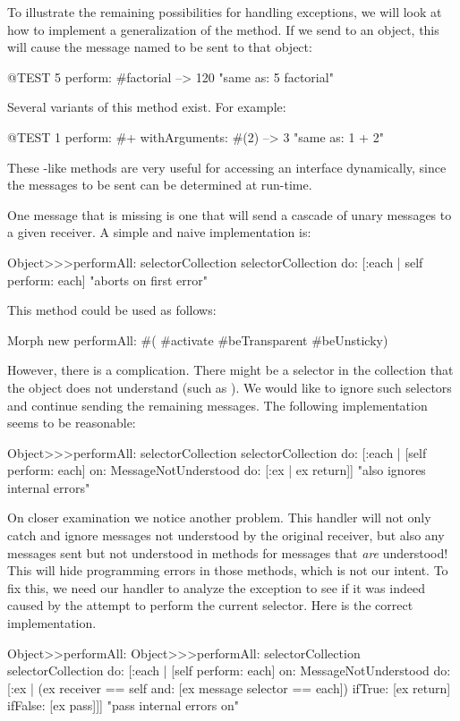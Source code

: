 \documentclass[a4paper,10pt,twoside]{book}
\begin{document}
To illustrate the remaining possibilities for handling exceptions, we will look at how to implement a generalization of the  method.
If we send  to an object, this will cause the message named  to be sent  to that object:
\begin{code}{@TEST}
5 perform: #factorial --> 120    "same as: 5 factorial"
\end{code}

Several variants of this method exist. For example:
\begin{code}{@TEST}
1 perform: #+ withArguments: #(2) --> 3    "same as: 1 + 2"
\end{code}
These -like methods are very useful for accessing an interface dynamically, since the messages to be sent can be determined at run-time.

One message that is missing is one that will send a cascade of unary messages to a given receiver. A simple and naive implementation is:
\begin{code}{}
Object>>>performAll: selectorCollection
	selectorCollection do: [:each | self perform: each]    "aborts on first error"
\end{code}

This method could be used as follows:
\begin{code}{}
Morph new performAll: #( #activate #beTransparent #beUnsticky)
\end{code}

However, there is a complication. There might be a selector in the collection that the object does not understand (such as ). We would like to ignore such selectors and continue sending the remaining messages. The following implementation seems to be reasonable:

\begin{code}{}
Object>>>performAll: selectorCollection 
	selectorCollection do: [:each |
		[self perform: each]
			on: MessageNotUnderstood
			do: [:ex | ex return]]    "also ignores internal errors"
\end{code}

On closer examination we notice another problem. This handler will not only catch and ignore messages not understood by the original receiver, but also any messages sent but not understood in methods for messages that \emph{are} understood! This will hide programming errors in those methods, which is not our intent.
To fix this, we need our handler to analyze the exception to see if it was indeed caused by the attempt to perform the current selector.
Here is the correct implementation.
\begin{method}[objectPerformAll]{Object>>performAll:}
Object>>>performAll: selectorCollection 
	selectorCollection do: [:each | 
		[self perform: each] 
			on: MessageNotUnderstood 
			do: [:ex | (ex receiver == self and: [ex message selector == each]) 
				ifTrue: [ex return] 
				ifFalse: [ex pass]]]    "pass internal errors on"
\end{method}
\end{document}
